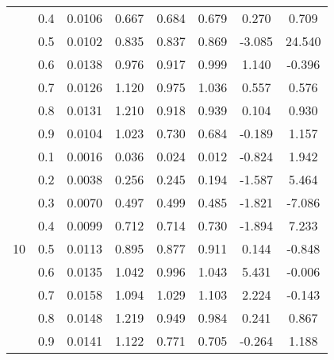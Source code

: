\documentclass[11pt,a4paper]{report}
\begin{document}
\begin{longtable}{ | c | c || c | c | c | c | c | c | }
 & 0.4 & 0.0106 & 0.667 & 0.684 & 0.679 & 0.270 & 0.709 \\
 & 0.5 & 0.0102 & 0.835 & 0.837 & 0.869 & -3.085 & 24.540 \\
 & 0.6 & 0.0138 & 0.976 & 0.917 & 0.999 & 1.140 & -0.396 \\
 & 0.7 & 0.0126 & 1.120 & 0.975 & 1.036 & 0.557 & 0.576 \\
 & 0.8 & 0.0131 & 1.210 & 0.918 & 0.939 & 0.104 & 0.930 \\
 & 0.9 & 0.0104 & 1.023 & 0.730 & 0.684 & -0.189 & 1.157 \\
 \hline
\multirow{9}{*}{10} & 0.1 & 0.0016 & 0.036 & 0.024 & 0.012 & -0.824 & 1.942 \\
 & 0.2 & 0.0038 & 0.256 & 0.245 & 0.194 & -1.587 & 5.464 \\
 & 0.3 & 0.0070 & 0.497 & 0.499 & 0.485 & -1.821 & -7.086 \\
 & 0.4 & 0.0099 & 0.712 & 0.714 & 0.730 & -1.894 & 7.233 \\
 & 0.5 & 0.0113 & 0.895 & 0.877 & 0.911 & 0.144 & -0.848 \\
 & 0.6 & 0.0135 & 1.042 & 0.996 & 1.043 & 5.431 & -0.006 \\
 & 0.7 & 0.0158 & 1.094 & 1.029 & 1.103 & 2.224 & -0.143 \\
 & 0.8 & 0.0148 & 1.219 & 0.949 & 0.984 & 0.241 & 0.867 \\
 & 0.9 & 0.0141 & 1.122 & 0.771 & 0.705 & -0.264 & 1.188 \\
 \hline
\hline
\end{longtable}
\end{document}
